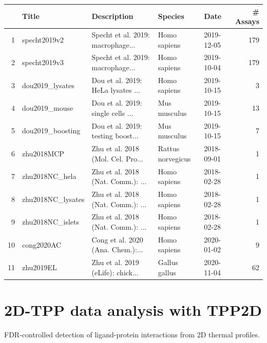 \documentclass{article}
\newcommand{\hcode}[2][lgray]{{\ttfamily\color{vdgray}\colorbox{#1}{#2}}}
\begin{document}
\begin{multicols}{2}
\begin{minipage}[t]{\linewidth}
    \centering
    \scriptsize
    \begin{tabular}{rllllr}
      \hline
     & Title & Description & Species & Date & \# Assays \\ 
      \hline
    1 & specht2019v2 & Specht et al. 2019: macrophage... & Homo sapiens & 2019-12-05 & 179 \\ 
      2 & specht2019v3 & Specht et al. 2019: macrophage... & Homo sapiens & 2019-10-04 & 179 \\ 
      3 & dou2019\_lysates & Dou et al. 2019: HeLa lysates
    ... & Homo sapiens & 2019-10-15 &   3 \\ 
      4 & dou2019\_mouse & Dou et al. 2019: single cells ... & Mus musculus & 2019-10-15 &  13 \\ 
      5 & dou2019\_boosting & Dou et al. 2019: testing boost... & Mus musculus & 2019-10-15 &   7 \\ 
      6 & zhu2018MCP & Zhu et al. 2018 (Mol. Cel. Pro... & Rattus norvegicus & 2018-09-01 &   1 \\ 
      7 & zhu2018NC\_hela & Zhu et al. 2018 (Nat. Comm.): ... & Homo sapiens & 2018-02-28 &   1 \\ 
      8 & zhu2018NC\_lysates & Zhu et al. 2018 (Nat. Comm.): ... & Homo sapiens & 2018-02-28 &   1 \\ 
      9 & zhu2018NC\_islets & Zhu et al. 2018 (Nat. Comm.): ... & Homo sapiens & 2018-02-28 &   1 \\ 
      10 & cong2020AC & Cong et al. 2020 (Ana. Chem.):... & Homo sapiens & 2020-01-02 &   9 \\ 
      11 & zhu2019EL & Zhu et al. 2019 (eLife): chick... & Gallus gallus & 2020-11-04 &  62 \\ 
       \hline
    \end{tabular}
\end{minipage}



\noindent
\begin{minipage}[t]{\linewidth}
  \vspace{0.55cm}
  \section*{\huge 2D-TPP data analysis with \hcode{TPP2D}}
  FDR-controlled detection of ligand-protein interactions from 2D thermal profiles.
  

\end{minipage}
\end{multicols}
\end{document}
